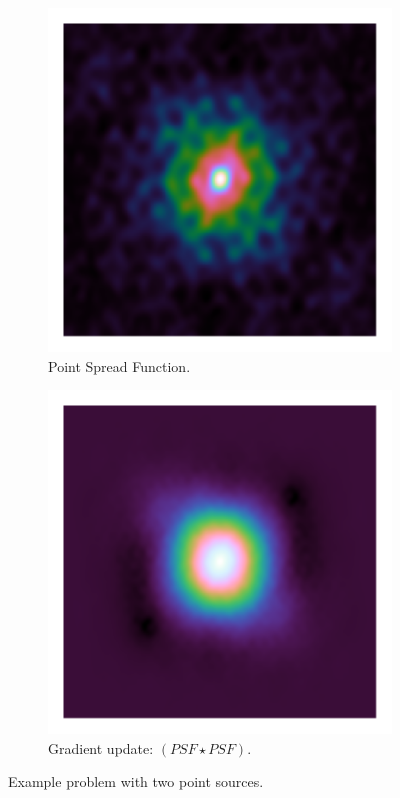 \begin{figure}[!h]
	\centering
	\begin{subfigure}[b]{0.3\linewidth}
		\includegraphics[width=\linewidth, clip, trim= 0.125in 0.125in 0.125in 0.125in]{./chapters/03.cd/simulated/psf.png}
		\caption{Point Spread Function.}
		\label{cd:efficient:update:dirty}
	\end{subfigure}
	\begin{subfigure}[b]{0.3\linewidth}
		\includegraphics[width=\linewidth, clip, trim= 0.125in 0.125in 0.125in 0.125in]{./chapters/03.cd/simulated/psfSquared.png}
		\caption{Gradient update: $(PSF \star PSF)$.}
		\label{cd:efficient:update:psf}
	\end{subfigure}
	\caption{Example problem with two point sources.}
	\label{cd:efficient:update:figure}
\end{figure}

